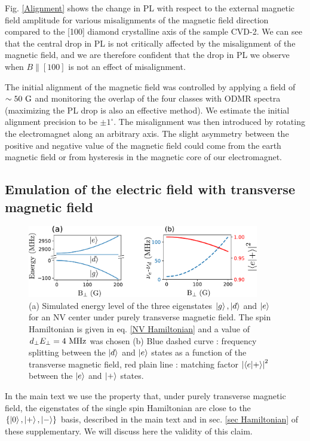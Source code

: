 \documentclass[preprintnumbers,amsmath,amssymb,onecolumn,12pt]{revtex4-2}\usepackage{graphicx}%
\begin{document}
Fig. \ref{Alignment} shows the change in PL with respect to the external magnetic field amplitude for various misalignments of the magnetic field direction compared to the [100] diamond crystalline axis of the sample CVD-2. We can see that the central drop in PL is not critically affected by the misalignment of the magnetic field, and we are therefore confident that the drop in PL we observe when $B\parallel [100]$ is not an effect of misalignment.

The initial alignment of the magnetic field was controlled by applying a field of $\sim 50\ \rm G$ and monitoring the overlap of the four classes with ODMR spectra (maximizing the PL drop is also an effective method). We estimate the initial alignment precision to be $\pm 1^\circ$. The misalignment was then introduced by rotating the electromagnet along an arbitrary axis. The slight asymmetry between the positive and negative value of the magnetic field could come from the earth magnetic field or from hysteresis in the magnetic core of our electromagnet.

\subsection{Emulation of the electric field with transverse magnetic field}
\begin{figure}
\includegraphics[width=0.9\textwidth]{Figures_SI/fig_transverse_field}
\caption{(a) Simulated energy level of the three eigenstates $\ket{g},\ket{d}$ and $\ket{e}$ for an NV center under purely transverse magnetic field. The spin Hamiltonian is given in eq. \ref{NV Hamiltonian} and a value of $d_\perp E_\perp = 4\ \rm MHz$ was chosen (b) Blue dashed curve : frequency splitting between the $\ket{d}$ and $\ket{e}$ states as a function of the transverse magnetic field, red plain line : matching factor $\abs{\bra{e}\ket{+}}^2$ between the $\ket{e}$ and $\ket{+}$ states.}
\label{theory_transverse_field}
\end{figure}
In the main text we use the property that, under purely transverse magnetic field, the eigenstates of the single spin Hamiltonian are close to the $\{ \ket{0},\ket{+},\ket{-} \}$ basis, described in the main text and in sec. \ref{sec Hamiltonian} of these supplementary. We will discuss here the validity of this claim.
\end{document}
